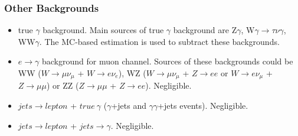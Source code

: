 \begin{frame}\frametitle {Other Backgrounds}
\footnotesize
\begin{itemize}
   \item true $\gamma$ background. Main sources of true $\gamma$ background are Z$\gamma$, W$\gamma \rightarrow \tau \nu \gamma$, WW$\gamma$. The MC-based estimation is used to subtract these backgrounds.
   \item $e \rightarrow \gamma$ background for muon channel. Sources of these backgrounds could be WW ($W \rightarrow \mu\nu_{\mu}$ + $W \rightarrow e\nu_e$), WZ ($W \rightarrow \mu\nu_{\mu}$ + $Z \rightarrow ee$ or $W \rightarrow e\nu_{\mu}$ + $Z \rightarrow \mu\mu$) or ZZ ($Z \rightarrow \mu\mu$ + $Z \rightarrow ee$). Negligible.
   \item $jets \rightarrow lepton$ + $true~\gamma$ ($\gamma$+jets and $\gamma\gamma$+jets events). Negligible.
   \item $jets \rightarrow lepton$ + $jets \rightarrow \gamma$. Negligible.
\end{itemize}
\end{frame}%

